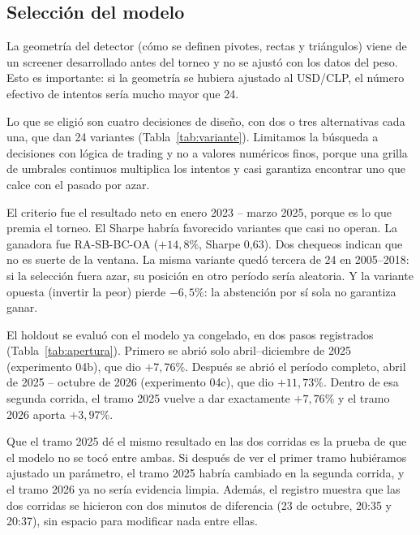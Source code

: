 \documentclass[10pt,a4paper]{article}
\begin{document}
\subsection{Selección del modelo}

La geometría del detector (cómo se definen pivotes, rectas y triángulos) viene de
un screener desarrollado antes del torneo y no se ajustó con los datos del peso.
Esto es importante: si la geometría se hubiera ajustado al USD/CLP, el número
efectivo de intentos sería mucho mayor que 24.

Lo que se eligió son cuatro decisiones de diseño, con dos o tres alternativas cada
una, que dan 24 variantes (Tabla~\ref{tab:variante}). Limitamos la búsqueda a
decisiones con lógica de trading y no a valores numéricos finos, porque una grilla
de umbrales continuos multiplica los intentos y casi garantiza encontrar uno que
calce con el pasado por azar.

El criterio fue el resultado neto en enero 2023 -- marzo 2025, porque es lo que
premia el torneo. El Sharpe habría favorecido variantes que casi no operan. La
ganadora fue RA-SB-BC-OA ($+14{,}8\%$, Sharpe 0,63). Dos chequeos indican que no es
suerte de la ventana. La misma variante quedó tercera de 24 en 2005--2018: si la
selección fuera azar, su posición en otro período sería aleatoria. Y la variante
opuesta (invertir la peor) pierde $-6{,}5\%$: la abstención por sí sola no garantiza
ganar.

El holdout se evaluó con el modelo ya
congelado, en dos pasos registrados (Tabla~\ref{tab:apertura}). Primero se abrió
solo abril--diciembre de 2025 (experimento 04b), que dio $+7{,}76\%$. Después se
abrió el período completo, abril de 2025 -- octubre de 2026 (experimento 04c), que
dio $+11{,}73\%$. Dentro de esa segunda corrida, el tramo 2025 vuelve a dar
exactamente $+7{,}76\%$ y el tramo 2026 aporta $+3{,}97\%$.

Que el tramo 2025 dé el mismo resultado en las dos corridas es la prueba de que el
modelo no se tocó entre ambas. Si después de ver el primer tramo hubiéramos
ajustado un parámetro, el tramo 2025 habría cambiado en la segunda corrida, y el
tramo 2026 ya no sería evidencia limpia. Además, el registro muestra que las dos
corridas se hicieron con dos minutos de diferencia (23 de octubre, 20:35 y 20:37),
sin espacio para modificar nada entre ellas.
\end{document}
